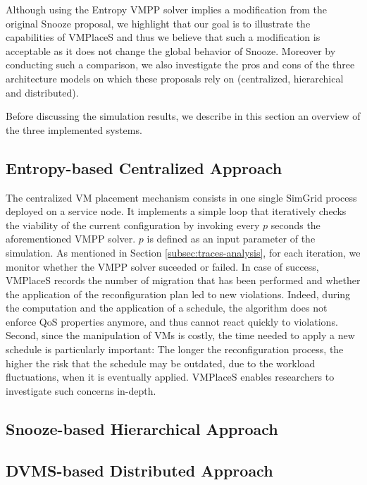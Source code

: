 \documentclass[conference]{IEEEtran}
\newcommand{\sg}{SimGrid\xspace}
\newcommand{\vmps}{VMPlaceS\xspace}
\begin{document}
%
Although using the Entropy VMPP solver
implies a modification from the original Snooze proposal,  we
highlight that our goal is to illustrate the capabilities of \vmps and
thus we believe that such a modification is acceptable as it does not
change the global behavior of Snooze. Moreover by
conducting such a comparison, we also investigate the pros and cons of
the three  architecture models on which these proposals rely on (\ie centralized, hierarchical and
distributed).

%
Before discussing the simulation results, we
describe in this section an overview of the three implemented systems.

\subsection{Entropy-based Centralized Approach}
\label{subsec:entropy}
The centralized VM placement mechanism consists in one single \sg
process deployed on a service node. It implements a simple loop that
iteratively checks the viability of the current configuration by
invoking every $p$ seconds the aforementioned VMPP solver. $p$ is
defined as an input parameter of the simulation. As mentioned in
Section \ref{subsec:traces-analysis}, for each iteration, we monitor
whether the VMPP solver suceeded or failed. In case of success, \vmps
records the number of migration that has been performed and whether
the application of the reconfiguration plan led to new violations.
 Indeed, during
the computation and the application of a schedule, the algorithm does
not enforce QoS properties anymore, and thus cannot react quickly to
violations. Second, since the manipulation of VMs is costly, the time
needed to apply a new schedule is particularly important: The longer
the reconfiguration process, the higher the risk that the schedule may
be outdated, due to the workload fluctuations, when it is eventually
applied.
\vmps enables researchers to investigate such concerns in-depth.


\subsection{Snooze-based Hierarchical Approach}
\label{subsec:snooze}


\subsection{DVMS-based Distributed Approach}
\label{subsec:dvms}

\end{document}
